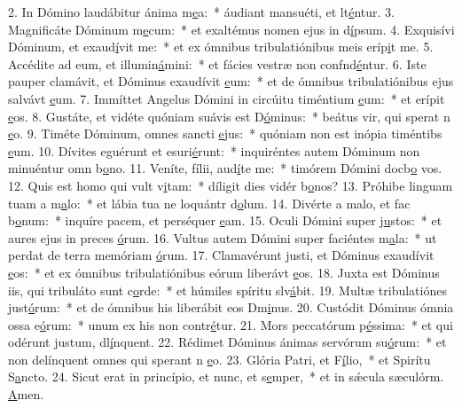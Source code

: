2. In Dómino laudábitur ánima m\uline{e}a:~* áudiant mansuéti, et lt\uline{é}ntur.
3. Magnificáte Dóminum m\uline{e}cum:~* et exaltémus nomen ejus in d\uline{í}psum.
4. Exquisívi Dóminum, et exaud\uline{í}vit me:~* et ex ómnibus tribulatiónibus meis eríp\uline{i}t me.
5. Accédite ad eum, et illumin\uline{á}mini:~* et fácies vestræ non confnd\uline{é}ntur.
6. Iste pauper clamávit, et Dóminus exaudívit \uline{e}um:~* et de ómnibus tribulatiónibus ejus salvávt \uline{e}um.
7. Immíttet Angelus Dómini in circúitu timéntium \uline{e}um:~* et erípit \uline{e}os.
8. Gustáte, et vidéte quóniam suávis est D\uline{ó}minus:~* beátus vir, qui sperat n \uline{e}o.
9. Timéte Dóminum, omnes sancti \uline{e}jus:~* quóniam non est inópia timéntibs \uline{e}um.
10. Dívites eguérunt et esuri\uline{é}runt:~* inquiréntes autem Dóminum non minuéntur omn b\uline{o}no.
11. Veníte, fílii, aud\uline{í}te me:~* timórem Dómini docb\uline{o} vos.
12. Quis est homo qui vult v\uline{i}tam:~* díligit dies vidér b\uline{o}nos?
13. Próhibe linguam tuam a m\uline{a}lo:~* et lábia tua ne loquántr d\uline{o}lum.
14. Divérte a malo, et fac b\uline{o}num:~* inquíre pacem, et perséquer \uline{e}am.
15. Oculi Dómini super j\uline{u}stos:~* et aures ejus in preces \uline{ó}rum.
16. Vultus autem Dómini super faciéntes m\uline{a}la:~* ut perdat de terra memóriam \uline{ó}rum.
17. Clamavérunt justi, et Dóminus exaudívit \uline{e}os:~* et ex ómnibus tribulatiónibus eórum liberávt \uline{e}os.
18. Juxta est Dóminus iis, qui tribuláto sunt c\uline{o}rde:~* et húmiles spíritu slv\uline{á}bit.
19. Multæ tribulatiónes just\uline{ó}rum:~* et de ómnibus his liberábit eos Dm\uline{i}nus.
20. Custódit Dóminus ómnia ossa e\uline{ó}rum:~* unum ex his non contr\uline{é}tur.
21. Mors peccatórum p\uline{é}ssima:~* et qui odérunt justum, dl\uline{í}nquent.
22. Rédimet Dóminus ánimas servórum su\uline{ó}rum:~* et non delínquent omnes qui sperant n \uline{e}o.
23. Glória Patri, et F\uline{í}lio,~* et Spirítu S\uline{a}ncto.
24. Sicut erat in princípio, et nunc, et s\uline{e}mper,~* et in sǽcula sæculórm. \uline{A}men.
